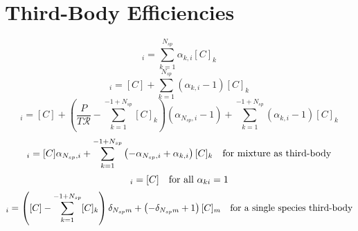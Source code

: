 \documentclass[a4paper,10pt]{article}
\newcommand{\ns}{N_{sp}}
\newcommand{\Ru}{\mathcal{R}}
\begin{document}
\section{Third-Body Efficiencies}
\begin{dmath} [X]_{i} = \sum_{k=1}^{\ns} \alpha_{k,i} [C]_{k}\end{dmath} 
\begin{dmath} [X]_{i} = [C] + \sum_{k=1}^{\ns} \left(\alpha_{k,i} - 1\right) [C]_{k}\end{dmath} 
\begin{dmath} [X]_{i} = [C] + \left(\frac{P}{T \Ru} - \sum_{k=1}^{-1 + \ns} [C]_{k}\right) \left(\alpha_{\ns,i} - 1\right) + \sum_{k=1}^{-1 + \ns} \left(\alpha_{k,i} - 1\right) [C]_{k}\end{dmath} 
\begin{dmath} [X]_{i}=[C] \alpha_{\ns,i} + \sum_{k=1}^{-1 + \ns} \left(- \alpha_{\ns,i} + \alpha_{k,i}\right) [C]_{k}\text{\quad for mixture as third-body}\end{dmath} 
\begin{dmath} [X]_{i}=[C]\text{\quad for all $\alpha_{ki} = 1$}\end{dmath} 
\begin{dmath} [X]_{i}=\left([C] - \sum_{k=1}^{-1 + \ns} [C]_{k}\right) \delta_{\ns m} + \left(- \delta_{\ns m} + 1\right) [C]_{m}\text{\quad for a single species third-body}\end{dmath} 
\end{document}
